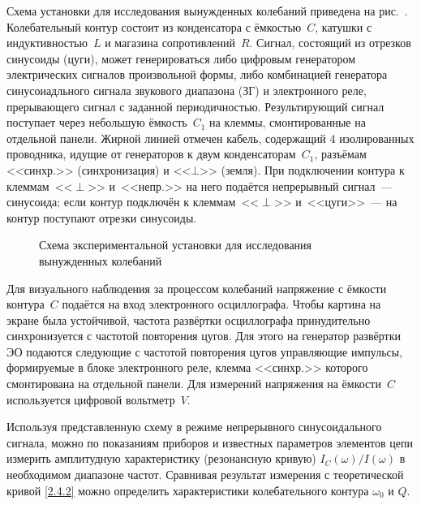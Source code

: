 \experiment 


Схема установки для исследования вынужденных колебаний приведена 
на рис.~. 
Колебательный контур 
состоит из конденсатора с ёмкостью~$C$, катушки с индуктивностью~$L$ и 
магазина сопротивлений~$R$. 
Сигнал, состоящий из отрезков синусоиды (цуги), может генерироваться
либо цифровым генератором электрических сигналов произвольной формы,
либо комбинацией генератора синусоиадльного сигнала звукового 
диапазона (ЗГ) и электронного реле, прерывающего сигнал с заданной периодичностью. 
Результирующий сигнал 
поступает через небольшую ёмкость~$C_1$ на клеммы, 
смонтированные на отдельной панели. 
Жирной линией отмечен кабель, содержащий 4 изолированных проводника, 
идущие от генераторов к двум конденсаторам~$C_1$, 
разъёмам <<синхр.>> (синхронизация) и <<$\bot$>> (земля). При подключении 
контура к клеммам~<<$\perp$>> и~<<непр.>> на него подаётся непрерывный 
сигнал~--- синусоида; если контур подключён к клеммам~<<$\perp$>> и~<<цуги>>~--- 
на контур поступают отрезки синусоиды.


\begin{figure}[h]
    \centering
\small	{}
	\caption{Схема экспериментальной установки для исследования вынужденных
колебаний}
\end{figure}

Для визуального наблюдения за процессом колебаний напряжение с ёмкости 
контура~$C$ подаётся на вход электронного осциллографа. Чтобы картина на 
экране была устойчивой, частота развёртки осциллографа принудительно 
синхронизуется с частотой повторения цугов. Для этого на генератор 
развёртки ЭО подаются следующие с частотой повторения цугов управляющие 
импульсы, формируемые в блоке электронного реле, клемма <<синхр.>> которого 
смонтирована на отдельной панели. Для измерений напряжения на ёмкости~$C$ 
используется цифровой вольтметр~$V$.

Используя представленную схему в режиме непрерывного синусоидального 
сигнала, можно по показаниям приборов и известных параметров элементов 
цепи измерить амплитудную характеристику (резонансную кривую) 
$I_C(\omega)/I(\omega)$ в необходимом диапазоне частот. 
Сравнивая результат измерения с теоретической кривой \eqref{2.4.2} можно 
определить характеристики колебательного контура $\omega_0$ и $Q$.
 

